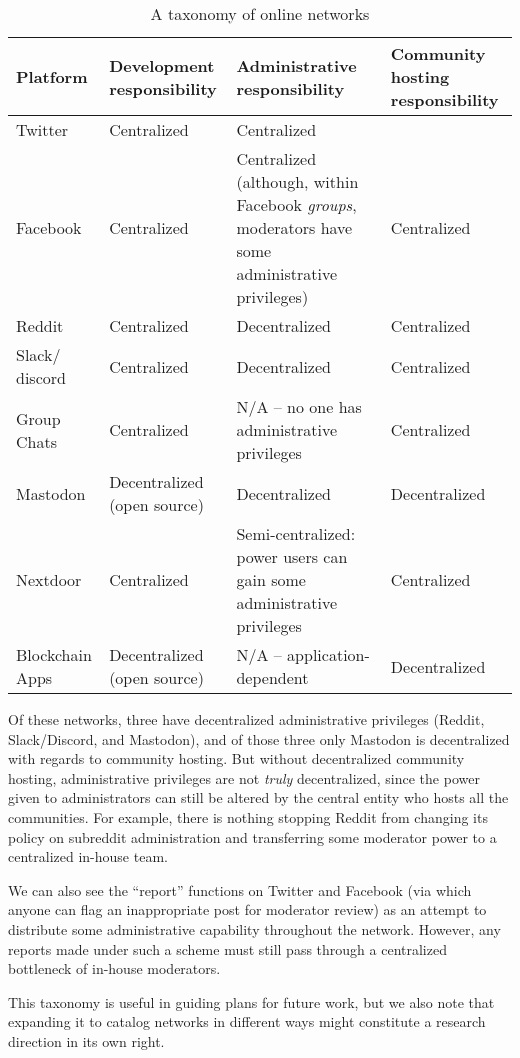 \documentclass[sigconf,authordraft]{acmart}
\begin{document}
\begin{table*}
  \caption{A taxonomy of online networks}
  \label{tab:taxonomy}
  \begin{tabularx}{\textwidth}{llXX}
    \toprule
    Platform & Development responsibility & Administrative responsibility & Community hosting responsibility \\
    \midrule
    Twitter  & Centralized & Centralized\\
    Facebook & Centralized & Centralized (although, within Facebook {\itshape groups}, moderators have some administrative privileges) & Centralized\\
    Reddit   & Centralized & Decentralized & Centralized  \\
    Slack/ discord & Centralized & Decentralized & Centralized \\
    Group Chats & Centralized & N/A -- no one has administrative privileges & Centralized \\
    Mastodon & Decentralized (open source) & Decentralized & Decentralized\\
    Nextdoor & Centralized & Semi-centralized: power users can gain some administrative privileges & Centralized \\
    Blockchain Apps & Decentralized (open source) & N/A -- application-dependent & Decentralized\\
    \bottomrule
  \end{tabularx}
\end{table*}

Of these networks, three have decentralized administrative privileges (Reddit, Slack/Discord, and Mastodon), and of those three only Mastodon is decentralized with regards to community hosting. But without decentralized community hosting, administrative privileges are not {\itshape truly} decentralized, since the power given to administrators can still be altered by the central entity who hosts all the communities. For example, there is nothing stopping Reddit from changing its policy on subreddit administration and transferring some moderator power to a centralized in-house team.

We can also see the ``report'' functions on Twitter and Facebook (via which anyone can flag an inappropriate post for moderator review) as an attempt to distribute some administrative capability throughout the network. However, any reports made under such a scheme must still pass through a centralized bottleneck of in-house moderators. 

This taxonomy is useful in guiding plans for future work, but we also note that expanding it to catalog networks in different ways might constitute a research direction in its own right.
\end{document}
